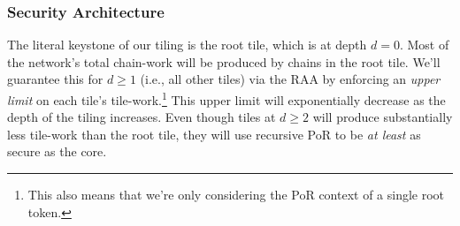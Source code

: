 





\subsubsection{Security Architecture}

\label{sec:tree-tiling-security-architecture}


The literal keystone of our tiling is the root tile, which is at depth $d = 0$.
Most of the network's total chain-work will be produced by chains in the root tile.
We'll guarantee this for $d \ge 1$ (i.e., all other tiles) via the RAA by enforcing an \emph{upper limit} on each tile's tile-work.\footnote{
    This also means that we're only considering the PoR context of a single root token.
}
This upper limit will exponentially decrease as the depth of the tiling increases.
Even though tiles at $d \ge 2$ will produce substantially less tile-work than the root tile, they will use recursive PoR to be \emph{at least} as secure as the core.


